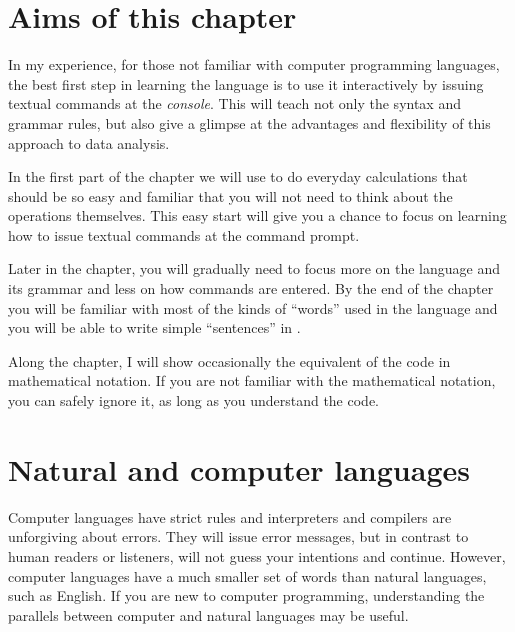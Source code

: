 \documentclass[krantz2]{krantz}\usepackage{knitr}%
\begin{document}

\section{Aims of this chapter}

In my experience, for those not familiar with computer programming languages, the best first step in learning the \Rlang language is to use it interactively by issuing textual commands at the \emph{console}. This will teach not only the syntax and grammar rules, but also give a glimpse at the advantages and flexibility of this approach to data analysis.

In the first part of the chapter we will use \Rlang to do everyday calculations that should be so easy and familiar that you will not need to think about the operations themselves. This easy start will give you a chance to focus on learning how to issue textual commands at the command prompt.

Later in the chapter, you will gradually need to focus more on the \Rlang language and its grammar and less on how commands are entered. By the end of the chapter you will be familiar with most of the kinds of ``words'' used in the \Rlang language and you will be able to write simple ``sentences'' in \Rlang.

Along the chapter, I will show occasionally the equivalent of the \Rlang code in mathematical notation. If you are not familiar with the mathematical notation, you can safely ignore it, as long as you understand the \Rlang code.

\section{Natural and computer languages}
Computer languages have strict rules and interpreters and compilers are unforgiving about errors. They will issue error messages, but in contrast to human readers or listeners, will not guess your intentions and continue. However, computer languages have a much smaller set of words than natural languages, such as English. If you are new to computer programming, understanding the parallels between computer and natural languages may be useful.
\end{document}

